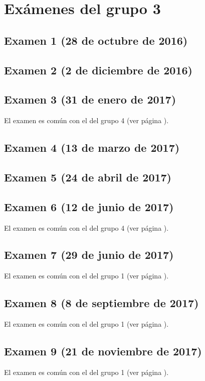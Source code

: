 \documentclass[a4paper,12pt,twoside]{book}
\begin{document}
\chapter{Exámenes del grupo 3}
\section{Examen 1 (28 de octubre de 2016)}
\section{Examen 2 (2 de diciembre de 2016)}
\section{Examen 3 (31 de enero de 2017)}
El examen es común con el del grupo 4 (ver página \pageref{examen_16_17_4_3}).
\section{Examen 4 (13 de marzo de 2017)}
\section{Examen 5 (24 de abril de 2017)}
\section{Examen 6 (12 de junio de 2017)} 
El examen es común con el del grupo 4 (ver página \pageref{examen_16_17_4_6}).
\section{Examen 7 (29 de junio de 2017)}
El examen es común con el del grupo 1 (ver página \pageref{examen_16_17_1_7}).
\section{Examen 8 (8 de septiembre de 2017)}
El examen es común con el del grupo 1 (ver página \pageref{examen_16_17_1_8}).
\section{Examen 9 (21 de noviembre de 2017)}
El examen es común con el del grupo 1 (ver página \pageref{examen_16_17_1_9}).
\end{document}
